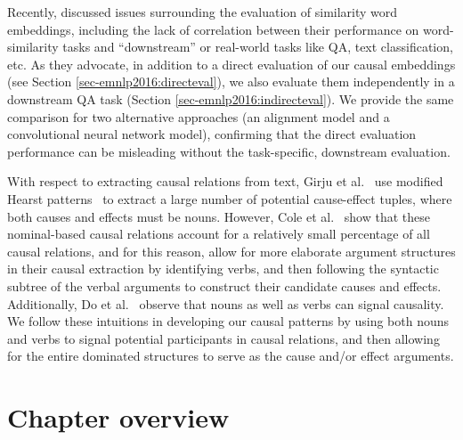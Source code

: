 Recently, \citet{faruqui2016problems} discussed issues surrounding the evaluation of similarity word embeddings, including the lack of correlation between their performance on word-similarity tasks and ``downstream'' or real-world tasks like QA, text classification, etc.  As they advocate, in addition to a direct evaluation of our causal embeddings (see Section \ref{sec-emnlp2016:directeval}), we also evaluate them independently in a downstream QA task (Section \ref{sec-emnlp2016:indirecteval}).  We provide the same comparison for two alternative approaches (an alignment model and a convolutional neural network model), confirming that the direct evaluation performance can be misleading without the task-specific, downstream evaluation.

With respect to extracting causal relations from text, Girju et al.~\citeyear{girju2002text} use modified Hearst patterns~\cite{hearst1992automatic} to extract a large number of potential cause-effect tuples, where both causes and effects must be nouns.
However, Cole et al.~\citeyear{cole2005lightweight} show that these nominal-based causal relations account for a relatively small percentage of all causal relations, and for this reason, \cite{yang2014multi} allow for more elaborate argument structures in their causal extraction by identifying verbs, and then following the syntactic subtree of the verbal arguments to construct their candidate causes and effects. 
Additionally, Do et al.~\citeyear{do2011minimally} observe that nouns as well as verbs can signal causality.  
We follow these intuitions in developing our causal patterns by using both nouns and verbs to signal potential participants in causal relations, and then allowing for the entire dominated structures to serve as the cause and/or effect arguments.



\section{Chapter overview}

